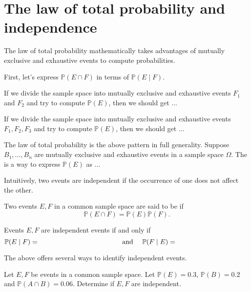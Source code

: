 \documentclass[../main.tex]{subfiles}
\begin{document}
 \section{The law of total probability and independence}

The law of total probability mathematically takes advantages of mutually exclusive and exhaustive events to compute probabilities.

First, let's express \(\mathbb{P}(E \cap F)\) in terms of \(\mathbb{P}(E \mid F)\).

If we divide the sample space into mutually exclusive and exhaustive events \(F_{1}\) and \(F_{2}\) and try to compute \(\mathbb{P}(E)\), then we should get ...


If we divide the sample space into mutually exclusive and exhaustive events \(F_{1}, F_{2}, F_{3}\) and try to compute \(\mathbb{P}(E)\), then we should get ...

\faStar{} The law of total probability is the above pattern in full generality. Suppose \(B_{1}, \ldots, B_{n}\) are mutually exclusive and exhaustive events in a sample space \(\Omega\). The  is a way to express \(\mathbb{P}(E)\) as ...
\clearpage

Intuitively, two events are independent if the occurrence of one does not affect the other.

\begin{definition}
  Two events \(E,F\) in a common sample space are said to be  if 
  \begin{equation} 
    \mathbb{P}(E \cap F) = \mathbb{P}(E) \mathbb{P}(F). 
  \end{equation}
\end{definition}

\faStar{} Events \(E,F\) are independent events if and only if
\begin{equation} \label{eq:probability-conditional-of-independent}
  \mathbb{P}(E \mid F) = \hspace{1.5in}
  \quad\text{ and }\quad
  \mathbb{P}(F \mid E) = \hspace{1.5in}
\end{equation}

The above offers several ways to identify independent events.

\begin{example}
  Let \(E, F\) be events in a common sample space. Let \(\mathbb{P}(E) = 0.3\), \(\mathbb{P}(B) = 0.2\) and \(\mathbb{P}(A \cap B) = 0.06\). Determine if \(E,F\) are independent.
\end{example}
\end{document}
